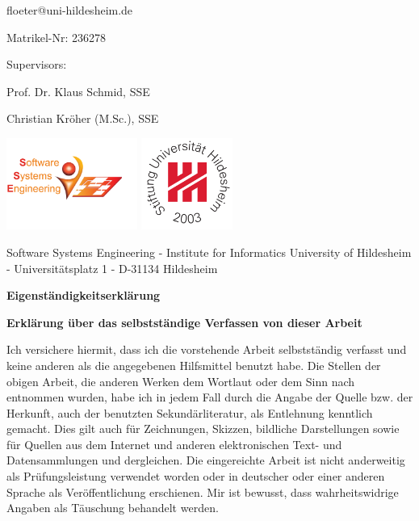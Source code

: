 \documentclass[a4paper]{article}
\newcommand\blankpage{%
    \null
    \thispagestyle{empty}%
    \addtocounter{page}{-1}%
    \newpage}
\begin{document}
\begin{center}
floeter@uni-hildesheim.de \par
Matrikel-Nr: 236278 \par
Supervisors: \par
Prof. Dr. Klaus Schmid, SSE \par
Christian Kr\"oher (M.Sc.), SSE\par

\includegraphics[height=3cm,keepaspectratio]{template/logo-left.pdf} \hfill \includegraphics[height=3cm,keepaspectratio]{template/logo-right.pdf} \par
\hspace{8cm}

\scriptsize{Software Systems Engineering - Institute for Informatics University of Hildesheim - Universit\"atsplatz 1 - D-31134 Hildesheim}
\end{center}

\afterpage{\blankpage}

\newpage
\lhead{{}}
\rhead{\leftmark}
\pagestyle{fancy}





\Large \textbf{Eigenst\"andigkeitserkl\"arung} \normalsize


\textbf{Erkl\"arung \"uber das selbstst\"andige Verfassen von dieser Arbeit}

Ich versichere hiermit, dass ich die vorstehende Arbeit selbstständig verfasst und keine anderen als die angegebenen Hilfsmittel benutzt habe. Die Stellen der obigen Arbeit, die anderen Werken dem Wortlaut oder dem Sinn nach entnommen wurden, habe ich in jedem Fall durch die Angabe der Quelle bzw. der Herkunft, auch der benutzten Sekund\"arliteratur, als Entlehnung kenntlich gemacht. Dies gilt auch f\"ur Zeich\-nun\-gen, Skizzen, bildliche Dar\-stel\-lung\-en sowie f\"ur Quellen aus dem Internet und anderen elektronischen Text- und Datensammlungen und dergleichen. Die eingereichte Arbeit ist nicht anderweitig als Pr\"u\-fungs\-leis\-tung verwendet worden oder in deutscher oder einer anderen Spra\-che als Ver\-\"off\-ent\-lich\-ung erschienen. Mir ist bewusst, dass wahrheitswidrige Angaben als Täu\-schung behandelt werden.
\end{document}
